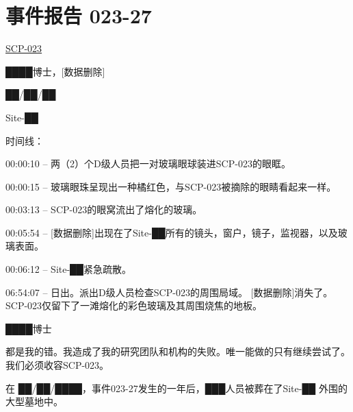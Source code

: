 \section{事件报告 023-27}

\label{sec:DOC-incident-023-27}

\hyperref[chap:SCP-023]{SCP-023}

████博士，[数据删除]

██\slash ██\slash ██

Site-██

时间线：

00:00:10 – 两（2）个D级人员把一对玻璃眼球装进SCP-023的眼眶。

00:00:15 – 玻璃眼珠呈现出一种橘红色，与SCP-023被摘除的眼睛看起来一样。

00:03:13 – SCP-023的眼窝流出了熔化的玻璃。

00:05:54 – [数据删除]出现在了Site-██所有的镜头，窗户，镜子，监视器，以及玻璃表面。

00:06:12 – Site-██紧急疏散。

06:54:07 – 日出。派出D级人员检查SCP-023的周围局域。 [数据删除]消失了。SCP-023仅留下了一滩熔化的彩色玻璃及其周围烧焦的地板。

\hr

████博士


都是我的错。我造成了我的研究团队和机构的失败。唯一能做的只有继续尝试了。我们必须收容SCP-023。

 在 ██\slash ██\slash ████，事件023-27发生的一年后，███人员被葬在了Site-██ 外围的大型墓地中。
